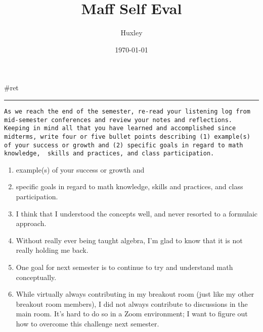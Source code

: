 \documentclass[letterpaper]{article}
\author{Huxley}
\date{\today}
\title{Maff Self Eval}
\renewcommand\maketitle{}
\begin{document}
\maketitle
\#ret

\noindent\rule{\textwidth}{0.5pt}

\begin{verbatim}
As we reach the end of the semester, re-read your listening log from mid-semester conferences and review your notes and reflections. Keeping in mind all that you have learned and accomplished since midterms, write four or five bullet points describing (1) example(s) of your success or growth and (2) specific goals in regard to math knowledge,  skills and practices, and class participation. 
\end{verbatim}

\begin{enumerate}
\item example(s) of your success or growth and
\item specific goals in regard to math knowledge, skills and practices, and
class participation.

\item I think that I understood the concepts well, and never resorted to a
formulaic approach.
\item Without really ever being taught algebra, I'm glad to know that it is
not really holding me back.
\item One goal for next semester is to continue to try and understand math
conceptually.
\item While virtually always contributing in my breakout room (just like my
other breakout room members), I did not always contribute to
discussions in the main room. It's hard to do so in a Zoom
environment; I want to figure out how to overcome this challenge next
semester.
\end{enumerate}
\end{document}
